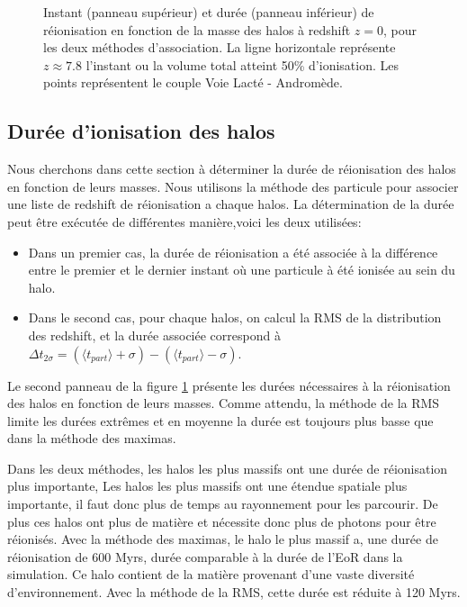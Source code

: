 \begin{figure}
        \caption[Instant et durée de réionisation]{Instant (panneau supérieur) et durée (panneau inférieur) de réionisation en fonction de la masse des halos à redshift $z=0$, pour les deux méthodes d'association. 
        La ligne horizontale représente $z\approx7.8$ l'instant ou la volume total atteint 50\% d'ionisation.
        Les points représentent le couple Voie Lacté - Andromède.
		\label{fig:CODA_t}}
\end{figure}


\subsection{Durée d'ionisation des halos}

Nous cherchons dans cette section à déterminer la durée de réionisation des halos en fonction de leurs masses.
Nous utilisons la méthode des particule pour associer une liste de redshift de réionisation a chaque halos.
La détermination de la durée peut être exécutée de différentes manière,voici les deux utilisées:
\begin{itemize}
\item Dans un premier cas, la durée de réionisation a été associée à la différence entre le premier et le dernier instant où une particule à été ionisée au sein du halo.
\item Dans le second cas, pour chaque halos, on calcul la RMS de la distribution des redshift, et la durée associée correspond à $\Delta t_{2\sigma} =  ( \langle t_{part} \rangle + \sigma) - ( \langle t_{part} \rangle - \sigma)$.
\end{itemize}

Le second panneau de la figure \ref{fig:CODA_t} présente les durées nécessaires à la réionisation des halos en fonction de leurs masses.
Comme attendu, la méthode de la RMS limite les durées extrêmes et en moyenne la durée est toujours plus basse que dans la méthode des maximas.

Dans les deux méthodes, les halos les plus massifs ont une durée de réionisation plus importante,
Les halos les plus massifs ont une étendue spatiale plus importante, il faut donc plus de temps au rayonnement pour les parcourir.
De plus ces halos ont plus de matière et nécessite donc plus de photons pour être réionisés.
Avec la méthode des maximas, le halo le plus massif a, une durée de réionisation de 600 Myrs, durée comparable à la durée de l'\ac{EoR} dans la simulation.
Ce halo contient de la matière provenant d'une vaste diversité d’environnement. %
Avec la méthode de la RMS, cette durée est réduite à 120 Myrs.

